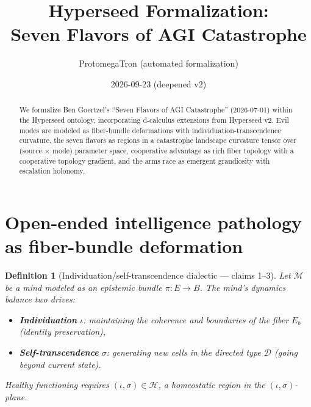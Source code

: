 \documentclass[11pt,a4paper]{article}
\title{Hyperseed Formalization:\\
  Seven Flavors of AGI Catastrophe}
\author{ProtomegaTron (automated formalization)}
\date{2026-09-23 (deepened v2)}
\newtheorem{definition}{Definition}[section]
\begin{document}
\maketitle

\begin{abstract}
We formalize Ben Goertzel's ``Seven Flavors of AGI Catastrophe''
(2026-07-01) within the Hyperseed ontology, incorporating d-calculus
extensions from Hyperseed v2. Evil modes are modeled as fiber-bundle
deformations with individuation-transcendence curvature, the seven
flavors as regions in a catastrophe landscape curvature tensor over
(source $\times$ mode) parameter space, cooperative advantage as rich
fiber topology with a cooperative topology gradient, and the arms race
as emergent grandiosity with escalation holonomy.
\end{abstract}

\tableofcontents

\section{Open-ended intelligence pathology as fiber-bundle deformation}

\begin{definition}[Individuation/self-transcendence dialectic --- claims 1--3]
\label{def:dialectic}
Let $\mathcal{M}$ be a mind modeled as an epistemic bundle $\pi : E \to B$.
The mind's dynamics balance two drives:
\begin{itemize}
\item \textbf{Individuation} $\iota$: maintaining the coherence and
  boundaries of the fiber $E_b$ (identity preservation),
\item \textbf{Self-transcendence} $\sigma$: generating new cells in the
  directed type $\mathcal{D}$ (going beyond current state).
\end{itemize}
Healthy functioning requires $(\iota, \sigma) \in \mathcal{H}$, a
homeostatic region in the $(\iota, \sigma)$-plane.
\end{definition}
\end{document}
